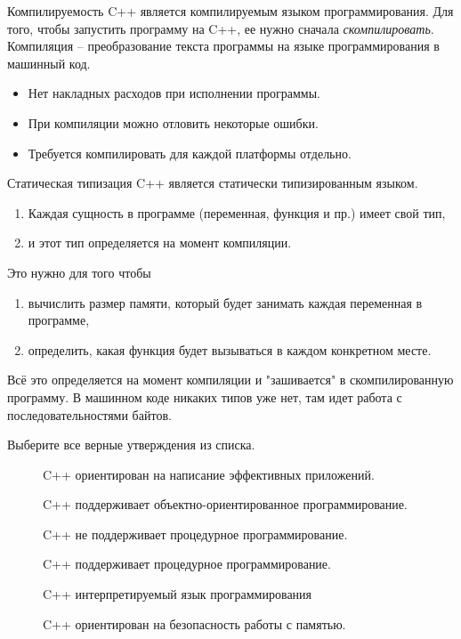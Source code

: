 \documentclass[9pt]{beamer}
\begin{document}
\begin{frame}{Компилируемость}
    C++ является компилируемым языком программирования.
    Для того, чтобы запустить программу на C++, ее нужно сначала
    \emph{скомпилировать}.
    Компиляция – преобразование текста программы на языке
    программирования в машинный код.
    \begin{itemize}
        \item Нет накладных расходов при исполнении программы.
        \item При компиляции можно отловить некоторые ошибки.
        \item Требуется компилировать для каждой платформы отдельно.
    \end{itemize}
\end{frame}
\begin{frame}{Статическая типизация}
    C++ является статически типизированным языком.
    \begin{enumerate}
        \item Каждая сущность в программе (переменная, функция и пр.)
        имеет свой тип,
        \item и этот тип определяется на момент компиляции.
    \end{enumerate}
    Это нужно для того чтобы
    \begin{enumerate}
        \item  вычислить размер памяти, который будет занимать каждая
        переменная в программе,
        \item  определить, какая функция будет вызываться в каждом
        конкретном месте.
    \end{enumerate}
    Всё это определяется на момент компиляции и "зашивается" в
    скомпилированную программу. В машинном коде никаких типов
    уже нет, там идет работа с последовательностями байтов.
\end{frame}
\begin{frame}
    Выберите все верные утверждения из списка.
    \begin{description}
        \item[\Square]  C++ ориентирован на написание эффективных
        приложений.
        \item[\Square]  C++ поддерживает объектно-ориентированное
        программирование.
        \item[\Square]  C++ не поддерживает процедурное
        программирование.
        \item[\Square]  C++ поддерживает процедурное
        программирование.
        \item[\Square]  C++ интерпретируемый язык программирования
        \item[\Square]  C++ ориентирован на безопасность работы с памятью.
    \end{description}
\end{frame}
\end{document}
